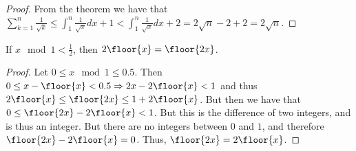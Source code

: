 \documentclass[crop=false,class=book,oneside]{standalone}
\begin{document}
            \begin{proof}
            From the theorem we have that $\sum_{k=1}^{n} \frac{1}{\sqrt{k}} \leq \int_{1}^{n}\frac{1}{\sqrt{x}}dx + 1 < \int_{1}^{n} \frac{1}{\sqrt{x}}dx +2 = 2\sqrt{n}-2+2 = 2\sqrt{n}$.
            \end{proof}
            \begin{lemma}
            If $x\mod 1 < \frac{1}{2}$, then $2\floor{x} = \floor{2x}$.
            \end{lemma}
            \begin{proof}
            Let $0\leq x \mod 1 \leq 0.5$. Then $0 \leq x-\floor{x}<0.5 \Rightarrow 2x-2\floor{x} <1$ and thus $2\floor{x} \leq \floor{2x} \leq 1+2\floor{x}$. But then we have that $0 \leq \floor{2x}-2\floor{x} <1$. But this is the difference of two integers, and is thus an integer. But there are no integers between $0$ and $1$, and therefore $\floor{2x}-2\floor{x} = 0$. Thus, $\floor{2x}=2\floor{x}$.
            \end{proof}
\end{document}
